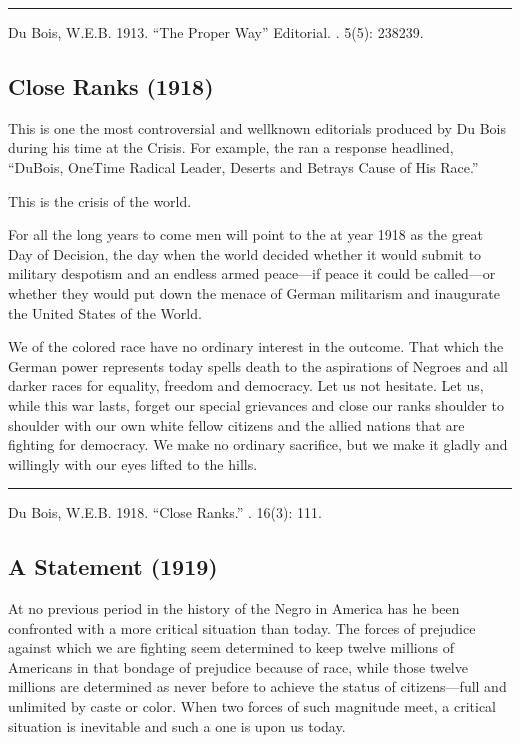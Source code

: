 \documentclass[letterpaper,10pt,english]{jupyterBook}
\begin{document}
\bigskip\hrule\bigskip


\sphinxAtStartPar
{} Du Bois, W.E.B. 1913. “The Proper Way” Editorial. . 5(5): 238\sphinxhyphen{}239.


\subsection{Close Ranks (1918)}
\label{\detokenize{Volumes/16/03/close_ranks:close-ranks-1918}}\label{\detokenize{Volumes/16/03/close_ranks::doc}}
\begin{sphinxShadowBox}
\sphinxstylesidebartitle{}

\sphinxAtStartPar
This is one the most controversial and well\sphinxhyphen{}known editorials produced by Du Bois during his time at the Crisis. For example, the  ran a response headlined, “DuBois, One\sphinxhyphen{}Time Radical Leader, Deserts and Betrays Cause of His Race.”
\end{sphinxShadowBox}

\sphinxAtStartPar
This is the crisis of the world.

\sphinxAtStartPar
For all the long years to come men will point to the at year 1918 as the great Day of Decision, the day when the world decided whether it would submit to military despotism and an endless armed peace—if peace it could be called—or whether they would put down the menace of German militarism and inaugurate the United States of the World.

\sphinxAtStartPar
We of the colored race have no ordinary interest in the outcome. That which the German power represents today spells death to the aspirations of Negroes and all darker races for equality, freedom and democracy. Let us not hesitate. Let us, while this war lasts, forget our special grievances and close our ranks shoulder to shoulder with our own white fellow citizens and the allied nations that are fighting for democracy. We make no ordinary sacrifice, but we make it gladly and willingly with our eyes lifted to the hills.


\bigskip\hrule\bigskip


\sphinxAtStartPar
{} Du Bois, W.E.B. 1918. “Close Ranks.” . 16(3): 111.


\subsection{A Statement (1919)}
\label{\detokenize{Volumes/19/01/statement:a-statement-1919}}\label{\detokenize{Volumes/19/01/statement::doc}}
\sphinxAtStartPar
At no previous period in the history of the Negro in America has he been confronted with a more critical situation than today. The forces of prejudice against which we are fighting seem determined to keep twelve millions of Americans in that bondage of prejudice because of race, while those twelve millions are determined as never before to achieve the status of citizens—full and unlimited by caste or color. When two forces of such magnitude meet, a critical situation is inevitable and such a one is upon us today.
\end{document}
